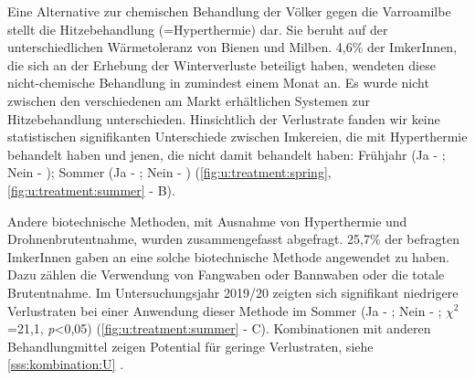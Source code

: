 
Eine Alternative zur chemischen Behandlung der Völker gegen die Varroamilbe stellt die Hitzebehandlung (=Hyperthermie) dar. Sie beruht auf der unterschiedlichen Wärmetoleranz von Bienen und Milben. 4,6\% der ImkerInnen, die sich an der Erhebung der Winterverluste beteiligt haben, wendeten diese nicht-chemische Behandlung in zumindest einem Monat an. Es wurde nicht zwischen den verschiedenen am Markt erhältlichen Systemen zur Hitzebehandlung unterschieden. Hinsichtlich der Verlustrate fanden wir keine statistischen signifikanten Unterschiede zwischen Imkereien, die mit Hyperthermie behandelt haben und jenen, die nicht damit behandelt haben: Frühjahr (Ja - ; Nein - ); Sommer (Ja - ; Nein - ) (\cref{fig:u:treatment:spring}, \cref{fig:u:treatment:summer} - B).


Andere biotechnische Methoden, mit Ausnahme von Hyperthermie und Drohnenbrutentnahme, wurden zusammengefasst abgefragt. 25,7\% der befragten ImkerInnen gaben an eine solche biotechnische Methode angewendet zu haben. Dazu zählen die Verwendung von Fangwaben oder Bannwaben oder die totale Brutentnahme.
\newline
Im Untersuchungsjahr 2019/20 zeigten sich signifikant niedrigere Verlustraten bei einer Anwendung dieser Methode im Sommer (Ja - ; Nein - ; $\chi^{2}$=21,1, \textit{p}<0,05) (\cref{fig:u:treatment:summer} - C). Kombinationen mit anderen Behandlungmittel zeigen Potential für geringe Verlustraten, siehe \ref{sss:kombination:U} .

\label{sss:kombination:U}

